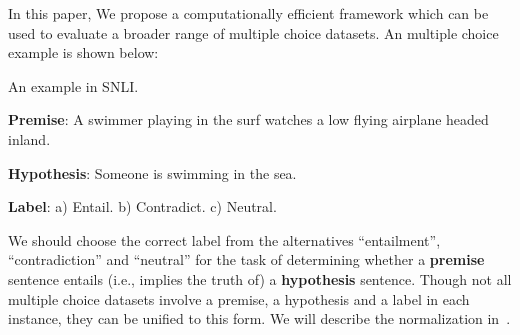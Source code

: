 In this paper,
We propose a computationally efficient framework
which can be used to evaluate
a broader range of multiple choice datasets. 
An multiple choice example is shown below:
\begin{example}\label{exp:snli}
An example in SNLI.

\noindent
\textbf{Premise}: A swimmer playing in the surf watches a low flying airplane headed inland. 

\noindent
\textbf{Hypothesis}: Someone is swimming in the sea.


\noindent
\textbf{Label}: a) Entail. b) Contradict.  c) Neutral.
\end{example}
We should choose the correct label from the alternatives ``entailment'', 
``contradiction'' and ``neutral'' for the 
task of determining whether a \textbf{premise} sentence 
entails (i.e., implies the truth of) a \textbf{hypothesis} sentence.
Though not all multiple choice datasets 
 involve a premise, 
a hypothesis and a label in each instance,
they can be unified to this form. We will describe the 
normalization in~.
